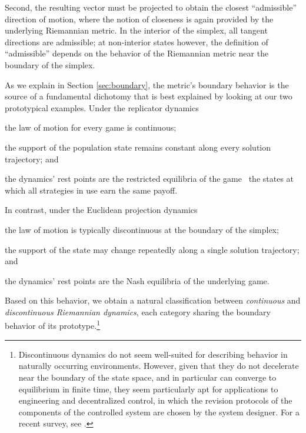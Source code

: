 \documentclass[reqno]{amsart}
\theoremstyle{plain}
\theoremstyle{definition}
\theoremstyle{remark}
\numberwithin{equation}{section}
\numberwithin{theorem}{section}
\begin{document}
Second, the resulting vector must be projected to obtain the closest ``admissible'' direction of motion, where the notion of closeness is again provided by the underlying Riemannian metric.
In the interior of the simplex, all tangent directions are admissible;
at non-interior states however, the definition of ``admissible'' depends on the behavior of the Riemannian metric near the boundary of the simplex.

As we explain in Section \ref{sec:boundary}, the metric's boundary behavior is the source of a fundamental dichotomy that is best explained by looking at our two prototypical examples.
Under the replicator dynamics
\begin{inparaenum}
\item
the law of motion for every game is continuous;
\item
the support of the population state remains constant along every solution trajectory;
and
\item
the dynamics' rest points are the restricted equilibria of the game \textendash\ the states at which all strategies in use earn the same payoff.
\end{inparaenum}
In contrast, under the Euclidean projection dynamics
\begin{inparaenum}
\item
the law of motion is typically discontinuous at the boundary of the simplex;
\item
the support of the state may change repeatedly along a single solution trajectory;
and
\item
the dynamics' rest points are the Nash equilibria of the underlying game.
\end{inparaenum}
Based on this behavior, we obtain a natural classification between \emph{continuous} and \emph{discontinuous Riemannian dynamics}, each category sharing the boundary behavior of its prototype.\footnote{Discontinuous dynamics do not seem well-suited for describing behavior in naturally occurring environments.
However, given that they do not decelerate near the boundary of the state space, and in particular can converge to equilibrium in finite time, they seem particularly apt for applications to engineering and decentralized control, in which the revision protocols of the components of the controlled system are chosen by the system designer.
For a recent survey, see \cite{MS15}.}
\end{document}
